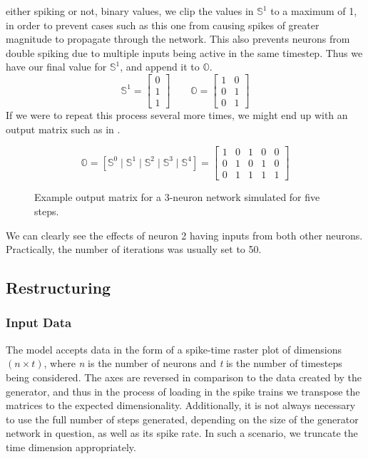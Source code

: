 either spiking or not, binary values, we clip the values in $\mathbb{S}^1$ to a 
maximum of 1, in order to prevent cases such as this one from causing spikes of 
greater magnitude to propagate through the network. This also prevents neurons 
from double spiking due to multiple inputs being active in the same timestep. 
Thus we have our final value for $\mathbb{S}^1$, and append it to $\mathbb{O}$.
\[
	\mathbb{S}^1 = \begin{bmatrix} 0 \\ 1 \\ 1 \end{bmatrix} \qquad
	\mathbb{O} = \begin{bmatrix}
		1 & 0\\
		0 & 1\\
		0 & 1 \end{bmatrix}
\]
If we were to repeat this process several more times, we might end up with an 
output matrix such as in .
\begin{figure}[H]
\[
	\mathbb{O} = \left[ \mathbb{S}^0 \mid
		\mathbb{S}^1 \mid \mathbb{S}^2 \mid \mathbb{S}^3 \mid \mathbb{S}^4 
	\right] = \begin{bmatrix}
		1 & 0 & 1 & 0 & 0\\
		0 & 1 & 0 & 1 & 0\\
		0 & 1 & 1 & 1 & 1
	\end{bmatrix}
\]
\caption{Example output matrix for a 3-neuron network simulated for five steps.}
\label{fig:exoutput}
\end{figure}\noindent
We can clearly see the effects of neuron 2 having inputs from both other 
neurons. Practically, the number of iterations was usually set to 50.


\subsection{Restructuring}
\label{subsec:restructuring}

\subsubsection{Input Data}
The model accepts data in the form of a spike-time raster plot of dimensions $(n 
\times t)$, where \textit{n} is the number of neurons and \textit{t} is the 
number of timesteps being considered. The axes are reversed in comparison to the 
data created by the generator, and thus in the process of loading in the spike 
trains we transpose the matrices to the expected dimensionality. Additionally, 
it is not always necessary to use the full number of steps generated, depending 
on the size of the generator network in question, as well as its spike rate. In 
such a scenario, we truncate the time dimension appropriately.

